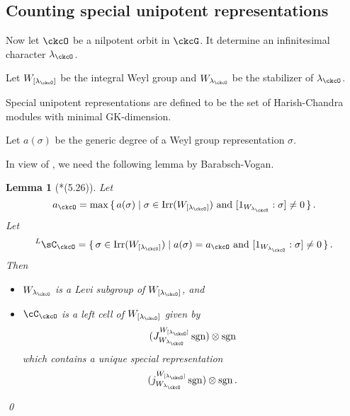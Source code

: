 \documentclass[12pt,a4paper]{amsart}
\newcommand{\sgn}{\operatorname{sgn}}
\numberwithin{equation}{section}
\newtheorem{lem}[thm]{Lemma}
\theoremstyle{remark}
\def\Irr{\mathrm{Irr}}
\def\lamck{\lambda_\ckcO}
\def\WLamck{W_{[\lambda_{\ckcO}]}}
\def\Wlamck{W_{\lamck}}
\def\LC{{}^L\sC}
\begin{document}
\subsection{Counting special unipotent representations}

Now let $\ckcO$ be a nilpotent orbit in $\ckcG$.
It determine an infinitesimal character $\lamck$.

Let $\WLamck$ be the integral Weyl group and $\Wlamck$ be the stabilizer of
$\lamck$.

Special unipotent representations are defined to be the set of
Harish-Chandra modules with minimal GK-dimension.

Let $a(\sigma)$ be the generic degree of a Weyl group representation $\sigma$.

In view of , we need the following lemma by Barabsch-Vogan. %
\begin{lem}[{\cite{BVUni}*{(5.26)}}]
  Let
  \[
    a_{\ckcO} = \max\set{a(\sigma)| \sigma \in \Irr(\WLamck) \text{ and }
    [1_{\Wlamck}: \sigma]\neq 0}.
  \]
  Let
  \[
    \LC_{\ckcO} =
    \set{\sigma \in \Irr(\WLamck) | a(\sigma) = a_{\ckcO}
      \text{ and } [1_{\Wlamck}: \sigma]\neq   0
    }.
  \]
  Then
  \begin{itemize}
   \item $\Wlamck$ is a Levi subgroup of $\WLamck$, and
 \item
  $\cC_{\ckcO}$ is a left cell of $\WLamck$ given by
  \[
    (J_{\Wlamck}^{\WLamck} \sgn )\otimes \sgn
  \]
  which contains a unique special representation
  \[
    (j_{\Wlamck}^{\WLamck} \sgn )\otimes \sgn.
  \]
  \end{itemize}
  \qed
\end{lem}
\end{document}
